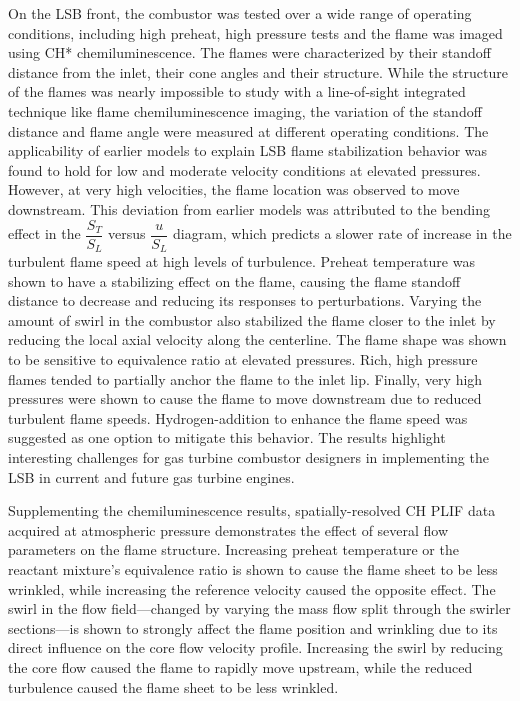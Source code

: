 On the LSB front, the combustor was tested over a wide range of operating conditions, including high preheat, high pressure tests and the flame was imaged using CH* chemiluminescence.
The flames were characterized by their standoff distance from the inlet, their cone angles and their structure.
While the structure of the flames was nearly impossible to study with a line-of-sight integrated technique like flame chemiluminescence imaging, the variation of the standoff distance and flame angle were measured at different operating conditions.
The applicability of earlier models to explain LSB flame stabilization behavior was found to hold for low and moderate velocity conditions at elevated pressures.
However, at very high velocities, the flame location was observed to move downstream.
This deviation from earlier models was attributed to the bending effect in the \(\dfrac{ S_T }{ S_L }\) versus \(\dfrac{ u }{ S_L}\) diagram, which predicts a slower rate of increase in the turbulent flame speed at high levels of turbulence.
Preheat temperature was shown to have a stabilizing effect on the flame, causing the flame standoff distance to decrease and reducing its responses to perturbations.
Varying the amount of swirl in the combustor also stabilized the flame closer to the inlet by reducing the local axial velocity along the centerline.
The flame shape was shown to be sensitive to equivalence ratio at elevated pressures.
Rich, high pressure flames tended to partially anchor the flame to the inlet lip.
Finally, very high pressures were shown to cause the flame to move downstream due to reduced turbulent flame speeds.
Hydrogen-addition to enhance the flame speed was suggested as one option to mitigate this behavior.
The results highlight interesting challenges for gas turbine combustor designers in implementing the LSB in current and future gas turbine engines.

Supplementing the chemiluminescence results, spatially-resolved CH PLIF data acquired at atmospheric pressure demonstrates the effect of several flow parameters on the flame structure.
Increasing preheat temperature or the reactant mixture's equivalence ratio is shown to cause the flame sheet to be less wrinkled, while increasing the reference velocity caused the opposite effect.
The swirl in the flow field---changed by varying the mass flow split through the swirler sections---is shown to strongly affect the flame position and wrinkling due to its direct influence on the core flow velocity profile.
Increasing the swirl by reducing the core flow caused the flame to rapidly move upstream, while the reduced turbulence caused the flame sheet to be less wrinkled.

